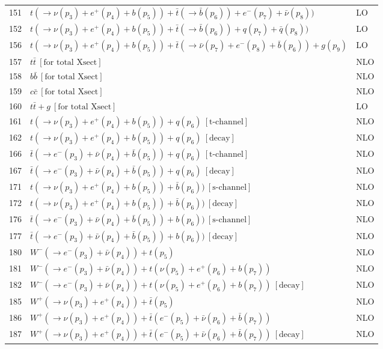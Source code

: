 \documentclass[12pt]{article}
\begin{document}
\begin{itemize}
\begin{table}
\begin{center}
\begin{tabular}{|l|l|l|}
151& $ t(\to \nu(p_3)+e^+(p_4)+b(p_5))+\bar{t}(\to \bar{b}(p_6))+e^-(p_7)+\bar{\nu}(p_8)) $ & LO \\
152& $ t(\to \nu(p_3)+e^+(p_4)+b(p_5))+\bar{t}(\to \bar{b}(p_6))+q(p_7)+\bar{q}(p_8)) $ & LO \\
\hline 
156& $t(\to \nu(p_3)+e^+(p_4)+b(p_5))+\bar{t}(\to \bar{\nu}(p_7)+e^-(p_8)+\bar{b}(p_6))+g(p_9) $ & LO \\
\hline 
157& $ t \bar{t} ~[ \mbox{for total Xsect} ] $ & NLO \\
158& $ b \bar{b} ~[ \mbox{for total Xsect} ] $ & NLO \\
159& $ c \bar{c} ~[ \mbox{for total Xsect} ] $ & NLO \\
160& $ t \bar{t} + g ~[ \mbox{for total Xsect} ] $ & LO \\
\hline 
161& $ t(\to \nu(p_3)+e^+(p_4)+b(p_5))+q(p_6) ~[ \mbox{t-channel} ] $ & NLO \\
162& $ t(\to \nu(p_3)+e^+(p_4)+b(p_5))+q(p_6) ~[ \mbox{decay} ] $ & NLO \\
166& $ \bar{t}(\to e^-(p_3)+\bar{\nu}(p_4)+\bar{b}(p_5))+q(p_6) ~[ \mbox{t-channel} ] $ & NLO \\
167& $ \bar{t}(\to e^-(p_3)+\bar{\nu}(p_4)+\bar{b}(p_5))+q(p_6) ~[ \mbox{decay} ] $ & NLO \\
\hline 
171& $ t(\to \nu(p_3)+e^+(p_4)+b(p_5))+\bar{b}(p_6)) ~[ \mbox{s-channel} ] $ & NLO \\
172& $ t(\to \nu(p_3)+e^+(p_4)+b(p_5))+\bar{b}(p_6)) ~[ \mbox{decay} ] $ & NLO \\
176& $ \bar{t}(\to e^-(p_3)+\bar{\nu}(p_4)+\bar{b}(p_5))+b(p_6)) ~[ \mbox{s-channel} ] $ & NLO \\
177& $ \bar{t}(\to e^-(p_3)+\bar{\nu}(p_4)+\bar{b}(p_5))+b(p_6)) ~[ \mbox{decay} ] $ & NLO \\
\hline 
180& $ W^-(\to e^-(p_3)+\bar{\nu}(p_4))+t(p_5) $ & NLO \\
181& $ W^-(\to e^-(p_3)+\bar{\nu}(p_4))+t(\nu(p_5)+e^+(p_6)+b(p_7)) $ & NLO \\
182& $ W^-(\to e^-(p_3)+\bar{\nu}(p_4))+t(\nu(p_5)+e^+(p_6)+b(p_7)) ~[ \mbox{decay} ] $ & NLO \\
185& $ W^+(\to \nu(p_3)+e^+(p_4))+\bar{t}(p_5) $ & NLO \\
186& $ W^+(\to \nu(p_3)+e^+(p_4))+\bar{t}(e^-(p_5)+\bar{\nu}(p_6)+\bar{b}(p_7)) $ & NLO \\
187& $ W^+(\to \nu(p_3)+e^+(p_4))+\bar{t}(e^-(p_5)+\bar{\nu}(p_6)+\bar{b}(p_7)) ~[ \mbox {decay} ] $ & NLO \\

\end{tabular}
\end{center}
\end{table}
\end{itemize}
\end{document}
